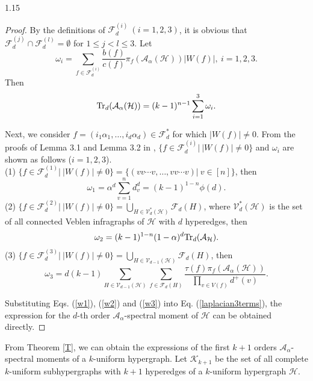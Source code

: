 \documentclass[preprint,12pt]{elsarticle1}
\numberwithin{equation}{section}
\begin{document}
\begin{spacing}{1.15}
\begin{proof}
By the definitions of $\mathcal{F}_{d}^{(i)}~(i=1,2,3)$, it is obvious that $\mathcal{F}_{d}^{(j)}\cap\mathcal{F}_{d}^{(l)}=\emptyset$ for $1\le j<l\le3$.
Let $$\omega_i=\sum\limits_{f\in\mathcal{F}_{d}^{(i)}}\frac{b(f)}{c(f)}\pi_{f}(\mathcal{A}_{\alpha}(\mathcal{H}))|W(f)|,\ i=1,2,3.$$
Then
\begin{equation}\label{laplacian3terms}
\textnormal{Tr}_{d}(\mathcal{A}_{\alpha}(\mathcal{H}))=(k-1)^{n-1}\sum\limits_{i=1}^{3}\omega_i.
\end{equation}

Next, we consider $f=(i_1\alpha_1,\ldots,i_d\alpha_d)\in\mathcal{F}_{d}^{*}$ for which $|W(f)|\neq0$.
From the proofs of Lemma 3.1 and Lemma 3.2 in \cite{L}, $\{f\in\mathcal{F}_{d}^{(i)}|~ |W(f)|\ne0\}$ and $\omega_i$ are shown as follows ($i=1,2,3$).\\
(1) $\{f\in\mathcal{F}_{d}^{(1)}|~ |W(f)|\ne0\}=\{(vv\cdots v,\ldots,vv\cdots v)|~ v\in[n]\}$, then
\begin{equation}\label{w1}
\omega_{1}=\alpha^{d}\sum\limits_{v=1}^{n}d_{v}^{d}=(k-1)^{1-n}\phi(d).
\end{equation}
(2) $\{f\in\mathcal{F}_{d}^{(2)}|~ |W(f)|\ne0\}=\bigcup_{H\in\mathcal{V}_{d}^{*}(\mathcal{H})}\mathcal{F}_d(H)$, where $\mathcal{V}_{d}^{*}(\mathcal{H})$ is the set of all connected Veblen infragraphs of $\mathcal{H}$ with $d$ hyperedges, then
\begin{equation}\label{w2}
\omega_2=(k-1)^{1-n}(1-\alpha)^{d}\textnormal{Tr}_{d}(\mathcal{A}_{\mathcal{H}}).
\end{equation}
(3) $\{f\in\mathcal{F}_{d}^{(3)}|~ |W(f)|\ne0\}=\bigcup_{H\in\mathcal{V}_{d-1}(\mathcal{H})}\mathcal{F}_d(H)$, then
\begin{equation}\label{w3}
\omega_3=d(k-1)\sum\limits_{H\in\mathcal{V}_{d-1}(\mathcal{H})}\sum\limits_{f\in\mathcal{F}_{d}(H)}\frac{\tau(f)\pi_{f}(\mathcal{A}_{\alpha}(\mathcal{H}))}{\prod\limits_{v\in V(f)}d^{+}(v)}.
\end{equation}

Substituting Eqs. (\ref{w1}), (\ref{w2}) and (\ref{w3}) into Eq. (\ref{laplacian3terms}), the expression for the $d$-th order $\mathcal{A}_{\alpha}$-spectral moment of $\mathcal{H}$ can be obtained directly.
\end{proof}


From Theorem \ref{T}, we can obtain the expressions of the first $k+1$ orders $\mathcal{A}_{\alpha}$-spectral moments of a $k$-uniform hypergraph.
Let $\mathcal{K}_{k+1}$ be the set of all complete $k$-uniform subhypergraphs with $k+1$ hyperedges of a $k$-uniform hypergraph $\mathcal{H}$.


\end{spacing}
\end{document}
